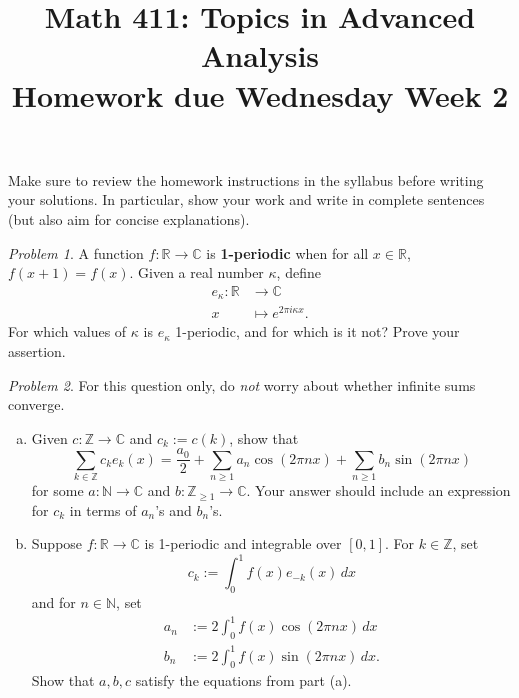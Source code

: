 \documentclass[11pt,twoside]{amsart}
\title{Math 411: Topics in Advanced Analysis\\ Homework due Wednesday Week 2}
\theoremstyle{plain}
\theoremstyle{remark}
\newtheorem{prob}{Problem}
\theoremstyle{definition}
\theoremstyle{definition}
\newcommand{\RR}{\mathbb{R}}
\newcommand{\ZZ}{\mathbb{Z}}
\newcommand{\CC}{\mathbb{C}}
\newcommand{\NN}{\mathbb{N}}
\begin{document}
\maketitle

\noindent Make sure to review the homework instructions in the syllabus before writing your solutions. In particular, show your work and write in complete sentences (but also aim for concise explanations).

\begin{prob}
A function $f\colon \RR\to \CC$ is \textbf{1-periodic} when for all $x\in \RR$, $f(x+1)=f(x)$. Given a real number $\kappa$, define
\[
\begin{aligned}
  e_\kappa\colon \RR&\longrightarrow \CC\\
  x&\longmapsto e^{2\pi i\kappa x}.
\end{aligned}
\]
For which values of $\kappa$ is $e_\kappa$ 1-periodic, and for which is it not? Prove your assertion.
\end{prob}


\begin{prob}
For this question only, do \emph{not} worry about whether infinite sums converge.
\begin{enumerate}[(a)]
\item Given $c\colon \ZZ\to \CC$ and $c_k := c(k)$, show that
\[
  \sum_{k\in \ZZ} c_k e_k(x) = \frac{a_0}{2}+\sum_{n\ge 1}a_n\cos(2\pi nx) + \sum_{n\ge 1}b_n\sin(2\pi nx)
\]
for some $a\colon \NN\to \CC$ and $b\colon \ZZ_{\ge 1}\to \CC$. Your answer should include an expression for $c_k$ in terms of $a_n$'s and $b_n$'s.
\item Suppose $f\colon \RR\to \CC$ is 1-periodic and integrable over $[0,1]$. For $k\in \ZZ$, set
\[
  c_k := \int_0^1 f(x)e_{-k}(x)\,dx
\]
and for $n\in \NN$, set
\[
\begin{aligned}
  a_n &:= 2\int_0^1 f(x)\cos(2\pi nx)\,dx\\
  b_n &:= 2\int_0^1 f(x)\sin(2\pi nx)\,dx.
\end{aligned}
\]
Show that $a,b,c$ satisfy the equations from part (a).
\end{enumerate}
\end{prob}
\end{document}
